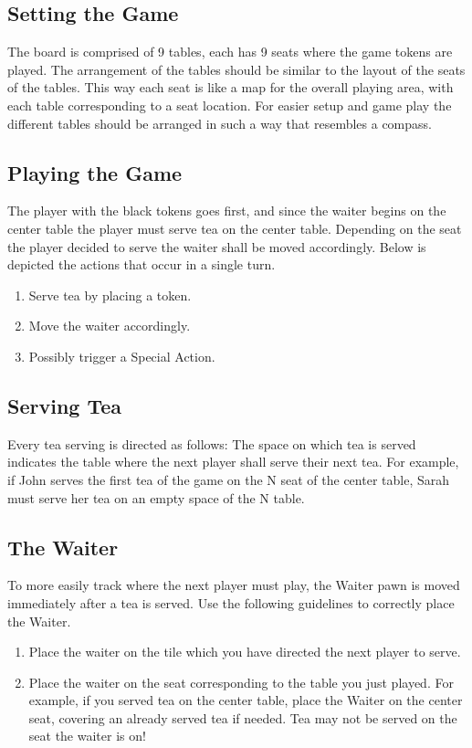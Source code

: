 \documentclass[a4paper]{article}
\begin{document}
\subsection{Setting​ ​the​ ​Game}
The board is comprised of 9 tables, each has 9 seats where the game tokens are played.
The arrangement of the tables should be similar to the layout of the seats of the tables. This way
each seat is like a map for the overall playing area, with each table corresponding to a seat
location. For easier setup and game play the different tables should be arranged in such a way that resembles a compass.

\subsection{Playing​ ​the​ ​Game}
The player with the black tokens goes first, and since the waiter begins on the center table
the player must serve tea on the center table. Depending on the seat the player decided to serve
the waiter shall be moved accordingly. Below is depicted the actions that occur in a single turn.
\begin{enumerate}
\item Serve tea by placing a token.
\item Move the waiter accordingly.
\item Possibly trigger a Special Action.
\end{enumerate}

\subsection{Serving​ ​Tea}
Every tea serving is directed as follows: The space on which tea is served indicates the
table where the next player shall serve their next tea. For example, if John serves the first tea of
the game on the N seat of the center table, Sarah must serve her tea on an empty space of the N
table.

\subsection{The​ ​Waiter}
To more easily track where the next player must play, the Waiter pawn is moved
immediately after a tea is served. Use the following guidelines to correctly place the Waiter.

\begin{enumerate}
\item Place the waiter on the tile which you have directed the next player to serve.
\item Place the waiter on the seat corresponding to the table you just played. For example, if
you served tea on the center table, place the Waiter on the center seat, covering an
already served tea if needed. Tea may not be served on the seat the waiter is on!
\end{enumerate}
\end{document}

